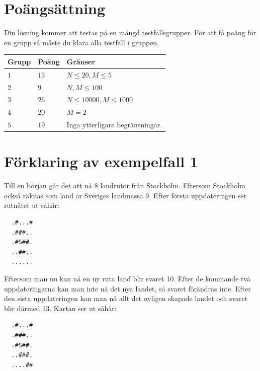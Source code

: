 \section*{Poängsättning}
Din lösning kommer att testas på en mängd testfallsgrupper.
För att få poäng för en grupp så måste du klara alla testfall i gruppen.

\noindent
\begin{tabular}{| l | l | p{12cm} |}
  \hline
  \textbf{Grupp} & \textbf{Poäng} & \textbf{Gränser} \\ \hline
  $1$    & $13$       & $N \leq 20, M \leq 5$ \\ \hline
  $2$    & $9$        & $N, M \leq 100$ \\ \hline
  $3$    & $26$       & $N \leq 10000, M \leq 1000$ \\ \hline
  $4$    & $20$       & $M=2$ \\ \hline
  $5$    & $19$       & Inga ytterligare begränsningar. \\ \hline
\end{tabular}

\section*{Förklaring av exempelfall 1}
Till en början går det att nå 8 landrutor från Stockholm. Eftersom Stockholm också räknas som land är Sveriges landmassa 9. Efter första uppdateringen ser rutnätet ut såhär:

\noindent
\begin{verbatim}
  .#...#
  .###..
  .#S##.
  ..##..
  ......
\end{verbatim}

\noindent
Eftersom man nu kan nå en ny ruta land blir svaret 10. Efter de kommande två uppdateringarna kan man inte nå det nya landet, så svaret förändras inte.
Efter den sista uppdateringen kan man nå allt det nyligen skapade landet och svaret blir därmed 13. Kartan ser ut såhär:

\noindent
\begin{verbatim}
  .#...#
  .###..
  .#S##.
  ..###.
  ....##
\end{verbatim}